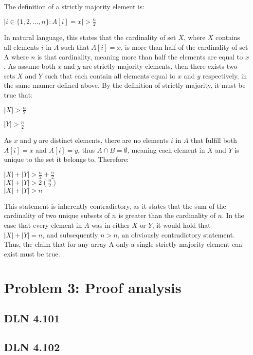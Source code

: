 \documentclass[titlepage]{article}
\begin{document}
The definition of a strictly majority element is:
\begin{center}
\(|{i \in \{1,2,...,n\}:A[i]=x}|>\frac{n}{2}\)
\end{center}
In natural language, this states that the cardinality of set $X$, where $X$ contains all elements $i$ in $A$ such that $A[i] = x$, is more than half of the cardinality of set A where $n$ is that cardinality, meaning more than half the elements are equal to $x$. As assume both $x$ and $y$ are strictly majority elements, then there exists two sets $X$ and $Y$ such that each contain all elements equal to $x$ and $y$ respectively, in the same manner defined above. By the definition of strictly majority, it must be true that:
\begin{center}
\( |X| > \frac{n}{2} \)

\( |Y| > \frac{n}{2} \)
\end{center}
As $x$ and $y$ are distinct elements, there are no elements $i$ in $A$ that fulfill both $A[i]=x$ and $A[i]=y$, thus $A \cap B = \emptyset$, meaning each element in $X$ and $Y$ is unique to the set it belongs to. Therefore:
\begin{center}
\( |X| + |Y| > \frac{n}{2} + \frac{n}{2} \)\\
\( |X| + |Y| > 2(\frac{n}{2})\)\\
\( |X| + |Y| > n\)\\
\end{center}
This statement is inherently contradictory, as it states that the sum of the cardinality of two unique subsets of $n$ is greater than the cardinality of $n$. In the case that every element in $A$ was in either $X$ or $Y$, it would hold that \( |X| + |Y| = n\), and subsequently $n > n$, an obviously contradictory statement. Thus, the claim that for any array A only a single strictly majority element can exist must be true.

\section{Problem 3: Proof analysis}

\subsection{DLN 4.101}  %

\subsection{DLN 4.102}  %
\end{document}
